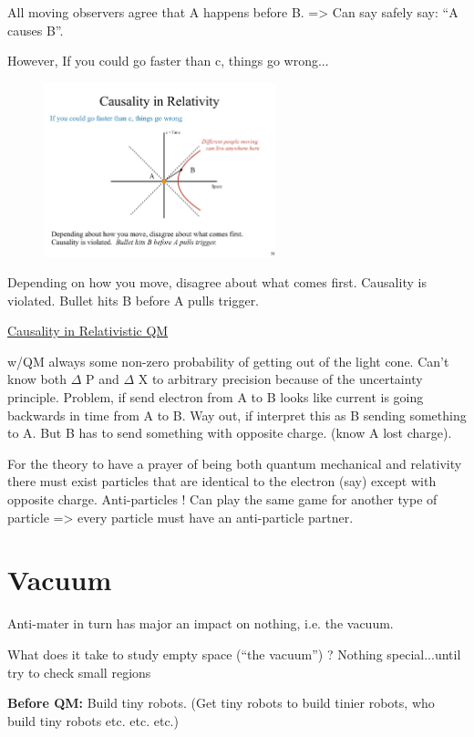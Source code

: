 {All moving observers agree that A happens before B. => Can say safely say: ``A causes B''.


However, If you could go faster than c, things go wrong...
\begin{figure}[h]
\centering
\includegraphics[width=0.6\textwidth]{./CausalitySpacelike.pdf}
\end{figure}

Depending on how you move, disagree about what comes first. Causality is violated. Bullet hits B before A pulls trigger.

\clearpage
\underline{Causality in Relativistic QM}

w/QM always some non-zero probability of getting out of the light cone.
Can't know both $\Delta$ P and $\Delta$ X to arbitrary precision because of the uncertainty principle.
Problem, if send electron from A to B looks like current is going backwards in time from A to B.
Way out, if interpret this as B sending something to A.
But B has to send something with opposite charge. (know A lost charge).

For the theory to have a prayer of being both quantum mechanical and relativity there must exist particles that are identical to the electron (say) except with opposite charge.
Anti-particles !
Can play the same game for another type of particle => every particle must have an anti-particle partner.

\section{Vacuum}
Anti-mater in turn has major an impact on nothing, i.e. the vacuum.

What does it take to study empty space (“the vacuum”) ?
Nothing special...until try to check small regions

\textbf{Before QM:}
Build tiny robots. (Get tiny robots to build tinier robots, who build tiny robots etc. etc. etc.)

}
